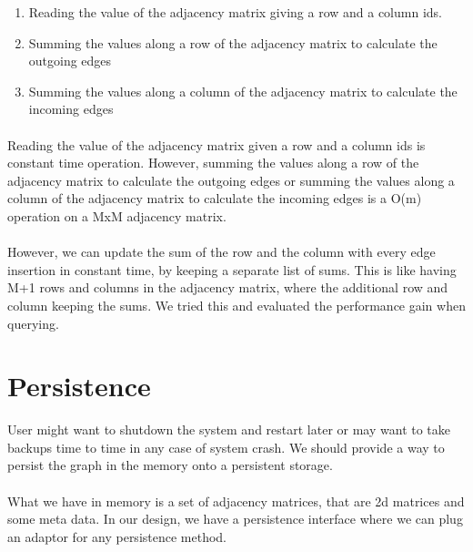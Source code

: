 \documentclass[12pt]{report}
\numberwithin{figure}{section}
\numberwithin{table}{section}
\begin{document}
\begin{enumerate}
\item Reading the value of the adjacency matrix giving a row and a column ids.
\item Summing the values along a row of the adjacency matrix to calculate the outgoing edges 
\item Summing the values along a column of the adjacency matrix to calculate the incoming edges
\end{enumerate}


\paragraph{}

Reading the value of the adjacency matrix given a row and a column ids is constant time operation. However, summing the values along a row of the adjacency matrix to calculate the outgoing edges or summing the values along a column of the adjacency matrix to calculate the incoming edges is a O(m) operation on a MxM adjacency matrix.

\paragraph{}

However, we can update the sum of the row and the column with every edge insertion in constant time, by keeping a separate list of sums. This is like having M+1 rows and columns in the adjacency matrix, where the additional row and column keeping the sums. We tried this and evaluated the performance gain when querying. 

\section{Persistence}
User might want to shutdown the system and restart later or may want to take backups time to time in any case of system crash. We should provide a way to persist the graph in the memory onto a persistent storage. 

\paragraph{}

What we have in memory is a set of adjacency matrices, that are 2d matrices and some meta data.  In our design, we have a persistence interface where we can plug an adaptor for any persistence method. 
\end{document}
